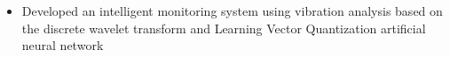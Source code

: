 \documentclass[10pt,letterpaper,ragged2e,compact]{mocv}
\begin{document}
\begin{paracol}{2}
\begin{itemize}
    \end{itemize}
    \divider
    \divider
    \begin{itemize}
        \item Developed an intelligent monitoring system using vibration analysis based on the discrete wavelet transform and Learning Vector Quantization artificial neural network
    \end{itemize}
\end{paracol}
\end{document}

